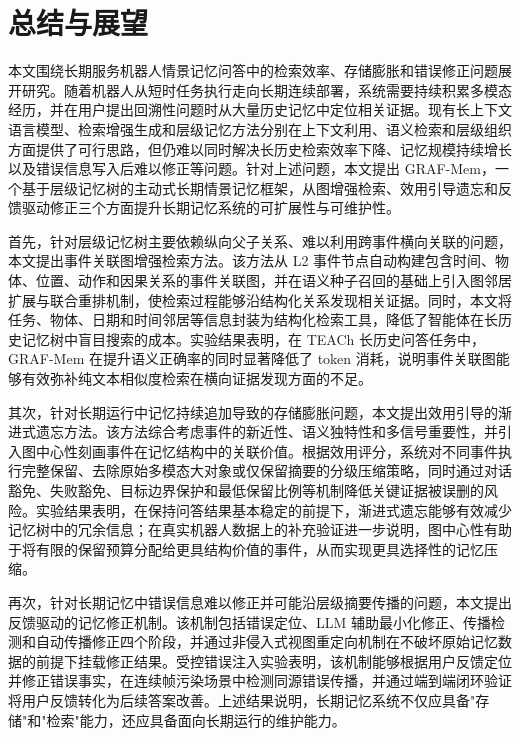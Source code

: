 
\chapter{总结与展望}

本文围绕长期服务机器人情景记忆问答中的检索效率、存储膨胀和错误修正问题展开研究。随着机器人从短时任务执行走向长期连续部署，系统需要持续积累多模态经历，并在用户提出回溯性问题时从大量历史记忆中定位相关证据。现有长上下文语言模型、检索增强生成和层级记忆方法分别在上下文利用、语义检索和层级组织方面提供了可行思路，但仍难以同时解决长历史检索效率下降、记忆规模持续增长以及错误信息写入后难以修正等问题。针对上述问题，本文提出 GRAF-Mem，一个基于层级记忆树的主动式长期情景记忆框架，从图增强检索、效用引导遗忘和反馈驱动修正三个方面提升长期记忆系统的可扩展性与可维护性。

首先，针对层级记忆树主要依赖纵向父子关系、难以利用跨事件横向关联的问题，本文提出事件关联图增强检索方法。该方法从 L2 事件节点自动构建包含时间、物体、位置、动作和因果关系的事件关联图，并在语义种子召回的基础上引入图邻居扩展与联合重排机制，使检索过程能够沿结构化关系发现相关证据。同时，本文将任务、物体、日期和时间邻居等信息封装为结构化检索工具，降低了智能体在长历史记忆树中盲目搜索的成本。实验结果表明，在 TEACh 长历史问答任务中，GRAF-Mem 在提升语义正确率的同时显著降低了 token 消耗，说明事件关联图能够有效弥补纯文本相似度检索在横向证据发现方面的不足。

其次，针对长期运行中记忆持续追加导致的存储膨胀问题，本文提出效用引导的渐进式遗忘方法。该方法综合考虑事件的新近性、语义独特性和多信号重要性，并引入图中心性刻画事件在记忆结构中的关联价值。根据效用评分，系统对不同事件执行完整保留、去除原始多模态大对象或仅保留摘要的分级压缩策略，同时通过对话豁免、失败豁免、目标边界保护和最低保留比例等机制降低关键证据被误删的风险。实验结果表明，在保持问答结果基本稳定的前提下，渐进式遗忘能够有效减少记忆树中的冗余信息；在真实机器人数据上的补充验证进一步说明，图中心性有助于将有限的保留预算分配给更具结构价值的事件，从而实现更具选择性的记忆压缩。

再次，针对长期记忆中错误信息难以修正并可能沿层级摘要传播的问题，本文提出反馈驱动的记忆修正机制。该机制包括错误定位、LLM 辅助最小化修正、传播检测和自动传播修正四个阶段，并通过非侵入式视图重定向机制在不破坏原始记忆数据的前提下挂载修正结果。受控错误注入实验表明，该机制能够根据用户反馈定位并修正错误事实，在连续帧污染场景中检测同源错误传播，并通过端到端闭环验证将用户反馈转化为后续答案改善。上述结果说明，长期记忆系统不仅应具备"存储"和"检索"能力，还应具备面向长期运行的维护能力。

